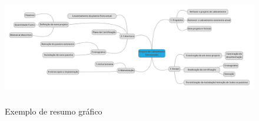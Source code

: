 \documentclass[	DIV=calc,%
							paper=a4,%
							fontsize=12pt,%
							onecolumn]{scrartcl}	 					%
\begin{document}
\begin{figure}[h]
	\centering
	\includegraphics[width=\textwidth,height=5cm,keepaspectratio]{fig4}
	\caption{Exemplo de resumo gráfico}
	\label{fig6}	
\end{figure}

\end{document}
